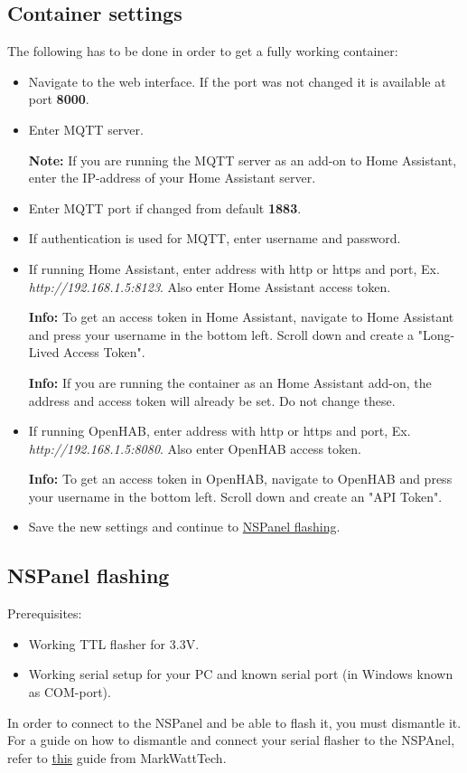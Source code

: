 \documentclass[10pt]{article}
\newcommand{\info}[1]{\begin{infoBox} \textbf{Info:} #1 \end{infoBox}}
\newcommand{\note}[1]{\begin{noteBox} \textbf{Note:} #1 \end{noteBox}}
\begin{document}
    \subsection{Container settings}
    The following has to be done in order to get a fully working container:
    \begin{itemize}
      \item Navigate to the web interface. If the port was not changed it is available at port \textbf{8000}.
      \item Enter MQTT server.
        \note{If you are running the MQTT server as an add-on to Home Assistant, enter the IP-address of your Home Assistant server.}
      \item Enter MQTT port if changed from default \textbf{1883}.
      \item If authentication is used for MQTT, enter username and password.
      \item If running Home Assistant, enter address with http or https and port, Ex. \textit{http://192.168.1.5:8123}. Also enter Home Assistant access token.
      \info{To get an access token in Home Assistant, navigate to Home Assistant and press your username in the bottom left. Scroll down and create a "Long-Lived Access Token".}
      \info{If you are running the container as an Home Assistant add-on, the address and access token will already be set. Do not change these.}
      \item If running OpenHAB, enter address with http or https and port, Ex. \textit{http://192.168.1.5:8080}. Also enter OpenHAB access token.
      \info{To get an access token in OpenHAB, navigate to OpenHAB and press your username in the bottom left. Scroll down and create an "API Token".}
    \item Save the new settings and continue to \hyperref[sec:nspanel_flashing]{NSPanel flashing}.
    \end{itemize}

    \subsection{NSPanel flashing}
    \label{sec:nspanel_flashing}
    Prerequisites:
    \begin{itemize}
      \item Working TTL flasher for 3.3V.
      \item Working serial setup for your PC and known serial port (in Windows known as COM-port).
    \end{itemize}
    In order to connect to the NSPanel and be able to flash it, you must dismantle it. For a guide on how to dismantle and connect your serial flasher to the NSPAnel, refer to \href{https://www.youtube.com/watch?v=p-AK4o5jOSI}{this} guide from MarkWattTech.
\end{document}
